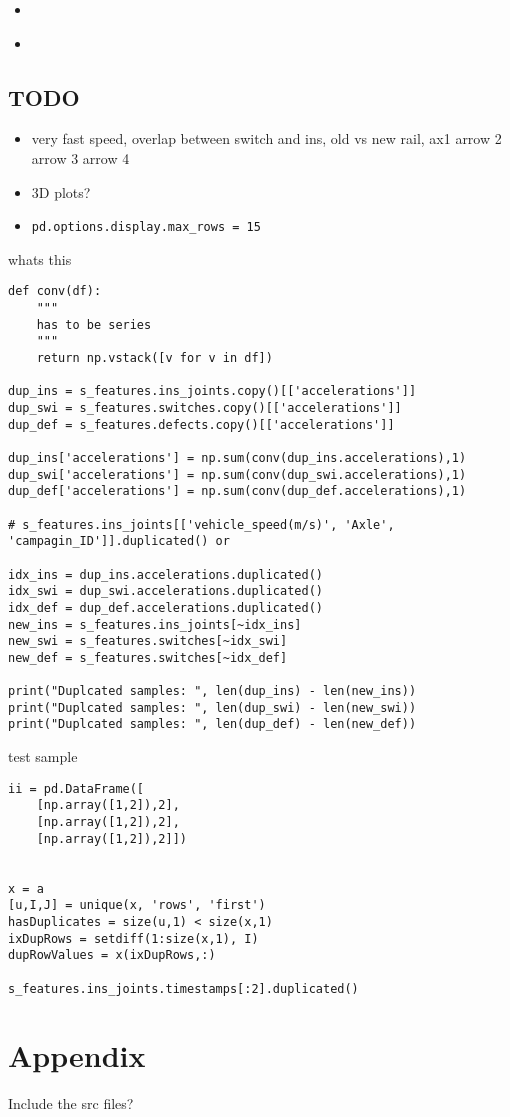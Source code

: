 \begin{itemize}
	\item
\end{itemize}

\begin{itemize}
	\item 
\end{itemize}

\newpage
\section{TODO}
\begin{itemize}
	\item very fast speed, overlap between switch and ins, old vs new rail, ax1 arrow 2 arrow 3 arrow 4
	\item 3D plots?
	\item \verb|pd.options.display.max_rows = 15|
\end{itemize}

\newpage
whats this
\begin{verbatim}
def conv(df):
    """
    has to be series
    """
    return np.vstack([v for v in df])

dup_ins = s_features.ins_joints.copy()[['accelerations']]
dup_swi = s_features.switches.copy()[['accelerations']]
dup_def = s_features.defects.copy()[['accelerations']]

dup_ins['accelerations'] = np.sum(conv(dup_ins.accelerations),1)
dup_swi['accelerations'] = np.sum(conv(dup_swi.accelerations),1)
dup_def['accelerations'] = np.sum(conv(dup_def.accelerations),1)

# s_features.ins_joints[['vehicle_speed(m/s)', 'Axle', 'campagin_ID']].duplicated() or

idx_ins = dup_ins.accelerations.duplicated()
idx_swi = dup_swi.accelerations.duplicated()
idx_def = dup_def.accelerations.duplicated()
new_ins = s_features.ins_joints[~idx_ins]
new_swi = s_features.switches[~idx_swi]
new_def = s_features.switches[~idx_def]

print("Duplcated samples: ", len(dup_ins) - len(new_ins))
print("Duplcated samples: ", len(dup_swi) - len(new_swi))
print("Duplcated samples: ", len(dup_def) - len(new_def))
\end{verbatim}

test sample
\begin{verbatim}
ii = pd.DataFrame([
    [np.array([1,2]),2], 
    [np.array([1,2]),2], 
    [np.array([1,2]),2]])
    
    
x = a
[u,I,J] = unique(x, 'rows', 'first')
hasDuplicates = size(u,1) < size(x,1)
ixDupRows = setdiff(1:size(x,1), I)
dupRowValues = x(ixDupRows,:)

s_features.ins_joints.timestamps[:2].duplicated()
\end{verbatim}



\newpage
\cleardoublepage
\appendix
\chapter{Appendix}
\label{newgrammar}
Include the src files?


